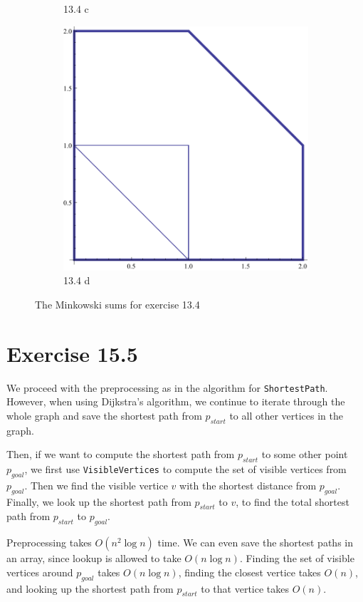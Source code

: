 \documentclass[11pt,a4paper]{article}
\begin{document}
\begin{figure}
\begin{subfigure}[b]{.4\textwidth}
        \caption{13.4 c}
    \end{subfigure}
    \begin{subfigure}[b]{.4\textwidth}
        \includegraphics[width=\textwidth]{ex13-4-d.pdf}
        \caption{13.4 d}
    \end{subfigure}
    \caption{The Minkowski sums for exercise 13.4}
    \label{ex13.4}
\end{figure}

\section{Exercise 15.5}

We proceed with the preprocessing as in the algorithm for
\verb+ShortestPath+. However, when using Dijkstra's algorithm, we
continue to iterate through the whole graph and save the shortest path
from $p_{start}$ to all other vertices in the graph.

Then, if we want to compute the shortest path from $p_{start}$ to some
other point $p_{goal}$, we first use \verb+VisibleVertices+ to compute
the set of visible vertices from $p_{goal}$. Then we find the visible
vertice $v$ with the shortest distance from $p_{goal}$. Finally, we
look up the shortest path from $p_{start}$ to $v$, to find the total
shortest path from $p_{start}$ to $p_{goal}$.

Preprocessing takes $O(n^2 \log n)$ time. We can even save the
shortest paths in an array, since lookup is allowed to take $O(n \log
n)$. Finding the set of visible vertices around $p_{goal}$ takes $O(n
\log n)$, finding the closest vertice takes $O(n)$, and looking up the
shortest path from $p_{start}$ to that vertice takes $O(n)$.
\end{document}
